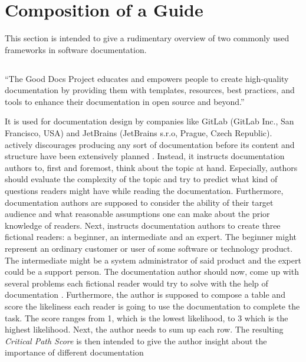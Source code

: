 \pagebreak
\section{Composition of a Guide}\label{s:guide-creation}
This section is intended to give a rudimentary overview of two commonly used frameworks in software documentation.


\subsection{\good}\label{s:b-gooddocs}
\begin{displayquote}
	``The Good Docs Project educates and empowers people to create high-quality documentation by providing them with templates, resources, best practices, and tools to enhance their documentation in open source and beyond.''
\end{displayquote}
It is used for documentation design by companies like GitLab (GitLab Inc., San Francisco, USA) and JetBrains (JetBrains s.r.o, Prague, Czech Republic).
\good\space actively discourages producing any sort of documentation before its content and structure have been extensively planned \cite{shorterGoodDocsProject2024}.
Instead, it instructs documentation authors to, first and foremost, think about the topic at hand.
Especially, authors should evaluate the complexity of the topic and try to predict what kind of questions readers might have while reading the documentation.
Furthermore, documentation authors are supposed to consider the ability of their target audience and what reasonable assumptions one can make about the prior knowledge of
readers.
Next, \good\space instructs documentation authors to create three fictional readers: a beginner, an intermediate and an expert.
The beginner might represent an ordinary customer or user of some software or technology product.
The intermediate might be a system administrator of said product
and the expert could be a support person.
The documentation author should now, come up with several problems each fictional reader would try to solve with the help of documentation \cite{shorterGoodDocsProject2024}.
Furthermore, the author is supposed to compose a table and score the likeliness each reader is
going to use the documentation to complete the task.
The score ranges from 1, which is the lowest likelihood, to 3 which is the highest likelihood.
Next, the author needs to sum up each row.
The resulting \textit{Critical Path Score} is then intended to give the author insight about the importance of different documentation

